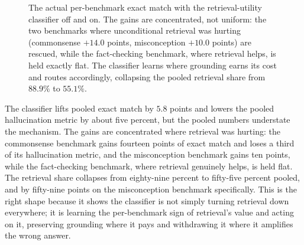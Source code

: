\begin{figure}[htbp]
\centering
{}
\caption[The asymmetric rescue]{The actual per-benchmark exact match with the
retrieval-utility classifier off and on. The gains are concentrated, not uniform: the
two benchmarks where unconditional retrieval was hurting (commonsense $+14.0$ points,
misconception $+10.0$ points) are rescued, while the fact-checking benchmark, where
retrieval helps, is held exactly flat. The classifier learns where grounding earns its
cost and routes accordingly, collapsing the pooled retrieval share from $88.9\%$ to
$55.1\%$.}
\label{fig:abl-ruc}
\end{figure}

\begin{precise}
The classifier lifts pooled exact match by $5.8$ points and lowers the pooled
hallucination metric by about five percent, but the pooled numbers understate the
mechanism. The gains are concentrated where retrieval was hurting: the commonsense
benchmark gains fourteen points of exact match and loses a third of its hallucination
metric, and the misconception benchmark gains ten points, while the fact-checking
benchmark, where retrieval genuinely helps, is held flat. The retrieval share collapses
from eighty-nine percent to fifty-five percent pooled, and by fifty-nine points on the
misconception benchmark specifically. This is the right shape because it shows the
classifier is not simply turning retrieval down everywhere; it is learning the
per-benchmark sign of retrieval's value and acting on it, preserving grounding where it
pays and withdrawing it where it amplifies the wrong answer.
\end{precise}

